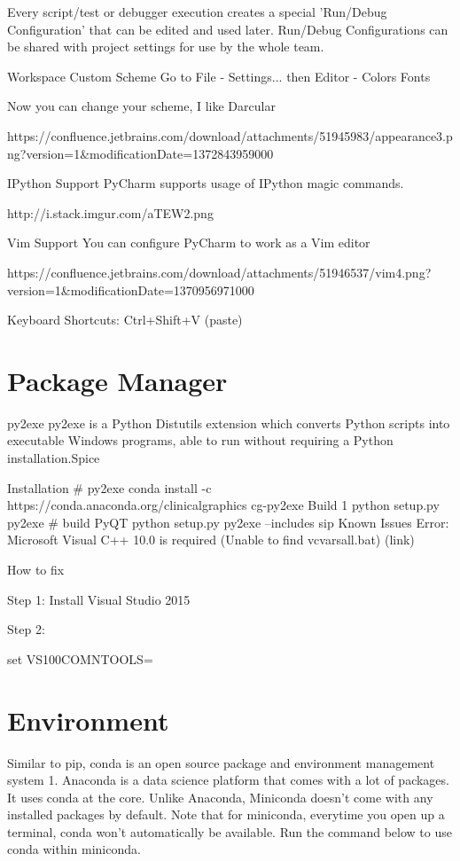 Every script/test or debugger execution creates a special 'Run/Debug Configuration' that can be edited and used later. Run/Debug Configurations can be shared with project settings for use by the whole team.

Workspace
Custom Scheme
Go to File - Settings... then Editor - Colors Fonts

Now you can change your scheme, I like Darcular

https://confluence.jetbrains.com/download/attachments/51945983/appearance3.png?version=1&modificationDate=1372843959000

IPython Support
PyCharm supports usage of IPython magic commands.

http://i.stack.imgur.com/aTEW2.png

Vim Support
You can configure PyCharm to work as a Vim editor

https://confluence.jetbrains.com/download/attachments/51946537/vim4.png?version=1&modificationDate=1370956971000

Keyboard Shortcuts: Ctrl+Shift+V (paste)

\section{Package Manager}

py2exe
py2exe is a Python Distutils extension which converts Python scripts into executable Windows programs, able to run without requiring a Python installation.Spice

Installation
# py2exe
conda install -c https://conda.anaconda.org/clinicalgraphics cg-py2exe
Build 1
python setup.py py2exe
# build PyQT
python setup.py py2exe --includes sip
Known Issues
Error: Microsoft Visual C++ 10.0 is required (Unable to find vcvarsall.bat) (link)

How to fix

Step 1: Install Visual Studio 2015

Step 2:

set VS100COMNTOOLS=%

\section{Environment}

Similar to pip, conda is an open source package and environment management system 1. Anaconda is a data science platform that comes with a lot of packages. It uses conda at the core. Unlike Anaconda, Miniconda doesn't come with any installed packages by default. Note that for miniconda, everytime you open up a terminal, conda won't automatically be available. Run the command below to use conda within miniconda.


